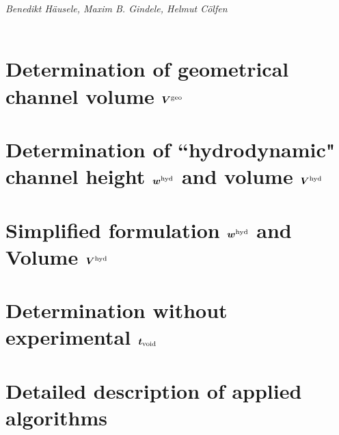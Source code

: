   
\emph{Benedikt Häusele, Maxim B. Gindele, Helmut Cölfen}\\
\noindent\hrulefill\\
\vspace*{-8ex}
{\let\clearpage\relax \tableofcontents}

{\let\clearpage\relax
   \chapter[Determination of geometrical channel volume $\Vgeo$]
  {Determination of geometrical channel volume $\bm{V^\text{geo}}$}
  
} %


{ \chapter[Determination of ``hydrodynamic" channel height $\whyd$ and Volume $\Vhyd$]
  {Determination of ``hydrodynamic" channel height $\bm{w^\text{hyd}}$ and volume $\bm{V^\text{hyd}}$}
}


{\let\clearpage\relax
\chapter[Simplified formulation $\whyd$ and volume $\Vhyd$]
{Simplified formulation $\bm{w^\text{hyd}}$ and Volume $\bm{V^\text{hyd}}$}
}


{\let\clearpage\relax
\chapter
[Determination without experimental $\tvoid$]
{
  Determination without experimental $\bm{t_\text{void}}$}
}


{\let\clearpage\relax
\chapter{Detailed description of applied algorithms}
}

%
%    
